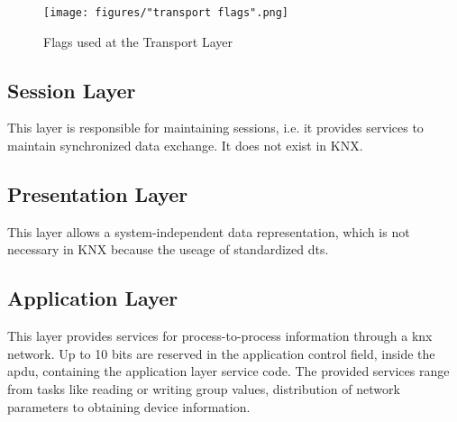 \begin{figure}
    \centering
    \texttt{[image: figures/"transport flags".png]}
    \caption{Flags used at the Transport Layer}
    \label{fig:tFlags}
\end{figure}

\subsection{Session Layer}

This layer is responsible for maintaining sessions, i.e. it provides services to maintain synchronized data exchange. It does not exist in KNX.

\subsection{Presentation Layer}

This layer allows a system-independent data representation, which is not necessary in KNX because the useage of standardized \glspl{dt}.

\subsection{Application Layer}

This layer provides services for process-to-process information through a \gls{knx} network. Up to 10 bits are reserved in the application control field,
inside the \gls{apdu}, containing the application layer service code. The provided services range from tasks like reading or writing group values, distribution of network
parameters to obtaining device information.